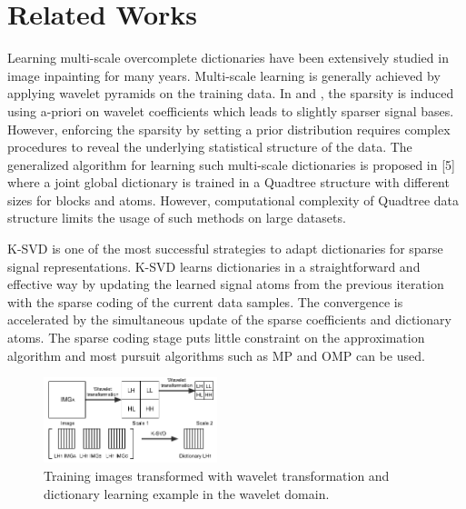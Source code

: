 \documentclass[conference]{IEEEtran}
\begin{document}
\section{Related Works}\label{related}
Learning multi-scale overcomplete dictionaries have been extensively studied in image inpainting for many years. Multi-scale learning is generally achieved by applying wavelet pyramids on the training data. In \cite{pati} and \cite{mallat}, the sparsity is induced using a-priori on wavelet coefficients which leads to slightly sparser signal bases. However, enforcing the sparsity by setting a prior distribution requires complex procedures to reveal the underlying statistical structure of the data. The generalized algorithm for learning such multi-scale dictionaries is proposed in [5] where a joint global dictionary is trained in a Quadtree structure with different sizes for blocks and atoms. However, computational complexity of Quadtree data structure limits the usage of such methods on large datasets.

K-SVD \cite{ksvd} is one of the most successful strategies to adapt dictionaries for sparse signal representations. K-SVD learns dictionaries in a straightforward and effective way by updating the learned signal atoms from the previous iteration with the sparse coding of the current data samples. The convergence is accelerated by the simultaneous update of the sparse coefficients and dictionary atoms. The sparse coding stage puts little constraint on the approximation algorithm and most pursuit algorithms such as MP and OMP can be used.

\begin{figure}[h]
\centering
\includegraphics[width=0.45\textwidth]{learning_schema}
\caption{Training images transformed with wavelet transformation and dictionary learning example in the wavelet domain.}
\label{dictLearningFigure}
\end{figure}
\end{document}
